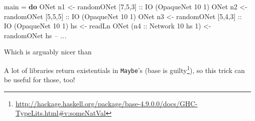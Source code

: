 \documentclass[]{article}
\newenvironment{Shaded}{}{}
\newcommand{\CommentTok}[1]{\textcolor[rgb]{0.38,0.63,0.69}{\textit{#1}}}
\newcommand{\DataTypeTok}[1]{\textcolor[rgb]{0.56,0.13,0.00}{#1}}
\newcommand{\DecValTok}[1]{\textcolor[rgb]{0.25,0.63,0.44}{#1}}
\newcommand{\FunctionTok}[1]{\textcolor[rgb]{0.02,0.16,0.49}{#1}}
\newcommand{\KeywordTok}[1]{\textcolor[rgb]{0.00,0.44,0.13}{\textbf{#1}}}
\newcommand{\NormalTok}[1]{#1}
\newcommand{\OtherTok}[1]{\textcolor[rgb]{0.00,0.44,0.13}{#1}}
\renewcommand{\href}[2]{#2\footnote{\url{#1}}}
\begin{document}
\begin{itemize}
\begin{Shaded}
\begin{Highlighting}[]
\NormalTok{main }\FunctionTok{=} \KeywordTok{do}
    \DataTypeTok{ONet}\NormalTok{ n1 }\OtherTok{<-}\NormalTok{ randomONet [}\DecValTok{7}\NormalTok{,}\DecValTok{5}\NormalTok{,}\DecValTok{3}\NormalTok{]}\OtherTok{ ::} \DataTypeTok{IO}\NormalTok{ (}\DataTypeTok{OpaqueNet} \DecValTok{10} \DecValTok{1}\NormalTok{)}
    \DataTypeTok{ONet}\NormalTok{ n2 }\OtherTok{<-}\NormalTok{ randomONet [}\DecValTok{5}\NormalTok{,}\DecValTok{5}\NormalTok{,}\DecValTok{5}\NormalTok{]}\OtherTok{ ::} \DataTypeTok{IO}\NormalTok{ (}\DataTypeTok{OpaqueNet} \DecValTok{10} \DecValTok{1}\NormalTok{)}
    \DataTypeTok{ONet}\NormalTok{ n3 }\OtherTok{<-}\NormalTok{ randomONet [}\DecValTok{5}\NormalTok{,}\DecValTok{4}\NormalTok{,}\DecValTok{3}\NormalTok{]}\OtherTok{ ::} \DataTypeTok{IO}\NormalTok{ (}\DataTypeTok{OpaqueNet} \DecValTok{10} \DecValTok{1}\NormalTok{)}
\NormalTok{    hs }\OtherTok{<-}\NormalTok{ readLn}
    \DataTypeTok{ONet}\NormalTok{ (}\OtherTok{n4 ::} \DataTypeTok{Network} \DecValTok{10}\NormalTok{ hs }\DecValTok{1}\NormalTok{) }\OtherTok{<-}\NormalTok{ randomONet hs}
    \CommentTok{-- ...}
\end{Highlighting}
\end{Shaded}

  Which is arguably nicer than

\begin{Shaded}
\end{Shaded}

  A lot of libraries return existentials in \texttt{Maybe}'s
  (\href{http://hackage.haskell.org/package/base-4.9.0.0/docs/GHC-TypeLits.html\#v:someNatVal}{base
  is guilty}), so this trick can be useful for those, too!


\end{itemize}
\end{document}
